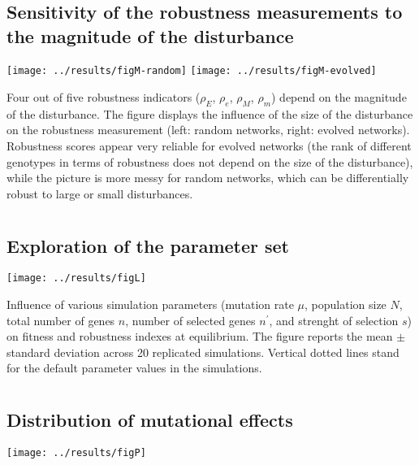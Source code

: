 \documentclass[10pt,a4paper]{article}
\newcommand{\earlyenv}{{\rho_E}}
\newcommand{\lateenv}{{\rho_e}}
\newcommand{\earlymut}{{\rho_M}}
\newcommand{\latemut}{{\rho_m}}
\begin{document}
\begin{appendices}
  \clearpage
  \section{}
    \label{supp:sensitmag}
    \subsection*{Sensitivity of the robustness measurements to the magnitude of the disturbance}
	\begin{center}
	\texttt{[image: ../results/figM-random]} \texttt{[image: ../results/figM-evolved]}
	\end{center}
	{\color{Gray} Four out of five robustness indicators ($\earlyenv$, $\lateenv$, $\earlymut$, $\latemut$) depend on the magnitude of the disturbance. The figure displays the influence of the size of the disturbance on the robustness measurement (left: random networks, right: evolved networks). Robustness scores appear very reliable for evolved networks (the rank of different genotypes in terms of robustness does not depend on the size of the disturbance), while the picture is more messy for random networks, which can be differentially robust to large or small disturbances. }


  \clearpage
  \section{}
    \label{supp:explo}
    \subsection*{Exploration of the parameter set}
	\begin{center}
	\texttt{[image: ../results/figL]} 
	\end{center}
	
	{\color{Gray}Influence of various simulation parameters (mutation rate $\mu$, population size $N$, total number of genes $n$, number of selected genes $n^\prime$, and strenght of selection $s$) on fitness and robustness indexes at equilibrium. The figure reports the mean $\pm$ standard deviation across 20 replicated simulations. Vertical dotted lines stand for the default parameter values in the simulations. }

  \clearpage
  \section{}
    \label{supp:mutdist}
    \subsection*{Distribution of mutational effects}
	\begin{center}
	\texttt{[image: ../results/figP]} 
	\end{center}
	

\end{appendices}
\end{document}
